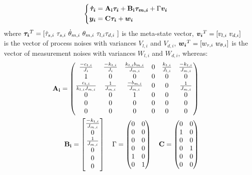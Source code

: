 \begin{equation}
\left \{
\begin{aligned}
\vects{\dot{\tau}_i} &=\vectm{A_i}\vects{\tau_i}+\vectm{B_i}\vects{\tau_{m,i}}+\vectmm{\Gamma}\vects{v_i} \\
		\vects{y_i} &=\vectm{C}\vects{\tau_i}+\vects{w_i}
		\end{aligned}
		\right .
		\label{eq:metasystem}
		\end{equation}
		where $\vects{\tau_i}^T=[ \dot{\tau}_{s,i}\ \tau_{s,i}\ \dot{\theta}_{m,i}\ \theta_{m,i}\  \tau_{l,i} \tau_{d,i}\ ]$ is the meta-state vector, ${ \boldsymbol {v_i}}^T=[ v_{l,i}\ v_{d,i} ]$ is the vector of process noises with variances $V_{l,i}$ and $V_{d,i}$, ${ \boldsymbol {w_i}}^T=[ w_{\tau,i}\ w_{\theta,i} ]$ is the vector of measurement noises with variances $W_{l,i}$ and $W_{d,i}$, whereas:
		\begin{equation}
		\begin{aligned}
		\vectm{A_i}=\mat{ \frac{-c_{t,i}}{J_i}  & \frac{-k_{t,i}}{J_i}& \frac{k_{t,i}b_{m,i}}{J_{m,i}} & 0 & \frac{ k_{t,i}}{J_{l,i}} &  \frac{-k_{t,i}}{J_{m,i}} \\
			1 & 0 & 0 & 0 & 0 & 0\\
			\frac{c_{t,i}}{  k_{t,i} J_{m,i} }&  \frac{1}{J_{m,i}} &  \frac{ -b_{m,i}}{J_{m,i}} & 0 & 0 &  \frac{1}{J_{m,i}}\\
			0 & 0 & 1 & 0 & 0 & 0\\
			0 & 0 & 0 & 0 & 0 & 0\\
			0 & 0 & 0 & 0 & 0 & 0} \\
		\vectm{B_i}=\vectlong{ \frac{ -k_{t,i}}{J_{m,i}} \\ 0 \\ \frac{1}{J_{m,i}} \\ 0 \\ 0 \\ 0}  \quad
		\vectmm{\Gamma}=\mat{ 0 & 0 \\ 0 & 0 \\ 0 & 0 \\ 0 & 0 \\ 1 & 0 \\ 0 & 1} \quad
		\vectm{C}=\mat{0 & 0 \\  1 & 0 \\  0 & 0  \\
			0 & 1 \\  0 & 0 \\ 0 & 0 } 
		\end{aligned}
		\label{stateobserver}
		\end{equation}


